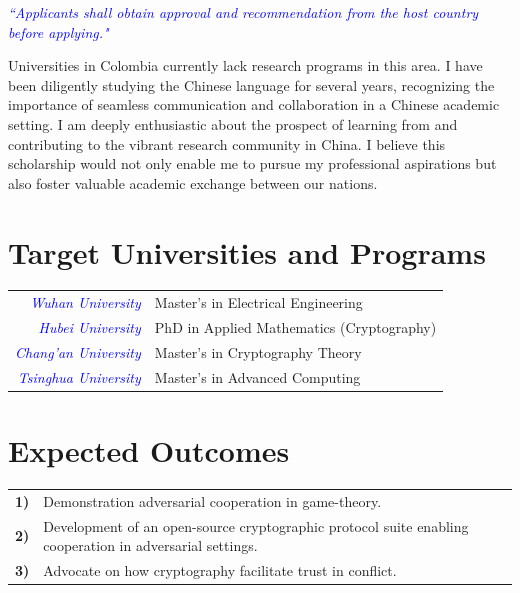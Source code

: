 \documentclass[conference]{IEEEtran}
\begin{document}
\begin{tcolorbox}[colback=gray!5!white, colframe=gray!10!white, sharp corners]
    \textcolor{blue}{\textit{``Applicants shall obtain approval and recommendation from the host country before applying."}}
\end{tcolorbox}

Universities in Colombia currently lack research programs in this area. I have been diligently studying the Chinese language for several years, 
recognizing the importance of seamless communication and collaboration in a Chinese academic setting. 
I am deeply enthusiastic about the prospect of learning from and contributing to the vibrant research community in China. 
I believe this scholarship would not only enable me to pursue my professional aspirations but also foster valuable academic exchange between our nations.

\section{Target Universities and Programs}
\vspace{5pt}
\begin{tabular}{rl}
    \textcolor{blue}{\small\textit{Wuhan University}} & {\small Master’s in Electrical Engineering}\\
    \textcolor{blue}{\small\textit{Hubei University}} & {\small PhD in Applied Mathematics (Cryptography)}\\
    \textcolor{blue}{\small\textit{Chang'an University}} & {\small Master’s in Cryptography Theory}\\
    \textcolor{blue}{\small\textit{Tsinghua University}} & {\small Master’s in Advanced Computing}
\end{tabular}

\section{Expected Outcomes}

\begin{tabular}{lp{210pt}}
    {\small \textbf{1)}} & {\small Demonstration adversarial cooperation in game-theory.} \\
    {\small \textbf{2)}} & {\small Development of an open-source cryptographic protocol suite enabling cooperation in adversarial settings.} \\
    {\small \textbf{3)}} & {\small Advocate on how cryptography facilitate trust in conflict.}
\end{tabular}
\end{document}
